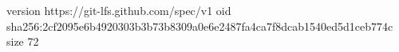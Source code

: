 version https://git-lfs.github.com/spec/v1
oid sha256:2cf2095e6b4920303b3b73b8309a0e6e2487fa4ca7f8dcab1540ed5d1ceb774c
size 72
